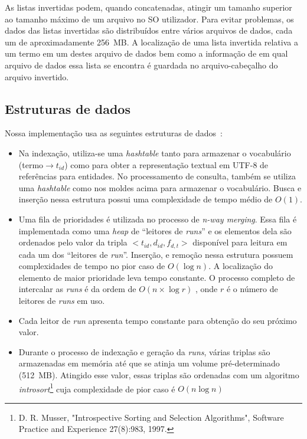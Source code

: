 \documentclass[10pt,twocolumn]{article}
\begin{document}
As listas invertidas podem, quando concatenadas, atingir um tamanho
superior ao tamanho máximo de um arquivo no SO utilizador. Para evitar
problemas, os dados das listas invertidas são distribuídos entre vários
arquivos de dados, cada um de aproximadamente 256~MB. A localização de
uma lista invertida relativa a um termo em um destes arquivo de dados
bem como a informação de em qual arquivo de dados essa lista se encontra
é guardada no arquivo-cabeçalho do arquivo invertido. 

\subsection{Estruturas de dados}\label{sec:datastructures}

Nossa implementação usa as seguintes estruturas de
dados~\cite{cormen-algorithms}:

\begin{itemize}

\item Na indexação, utiliza-se uma \emph{hashtable} tanto para armazenar
o vocabulário (termo\(\rightarrow t_{id}\)) como para obter a representação
textual em UTF-8 de referências para entidades. No processamento de
consulta, também se utiliza uma \emph{hashtable} como nos moldes acima
para armazenar o vocabulário.  Busca e inserção nessa estrutura possui
uma complexidade de tempo médio de \(O\left(1 \right)\).

\item Uma fila de prioridades é utilizada no processo de \emph{n-way
merging}. Essa fila é implementada como uma \emph{heap} de ``leitores de
\emph{runs}'' e os elementos dela são ordenados pelo valor da tripla
\(<t_{id}, d_{id}, f_{d,t}>\) disponível para leitura em cada um dos
``leitores de \emph{run}''.  Inserção, e remoção nessa estrutura possuem
complexidades de tempo no pior caso de \(O\left(\log n\right)\). A
localização do elemento de maior prioridade leva tempo constante.  O
processo completo de intercalar as \emph{runs} é da ordem de \(O\left(
n\times\log r\right)\) , onde \(r\) é o número de leitores de
\emph{runs} em uso.

\item Cada leitor de \emph{run} apresenta tempo constante para obtenção
do seu próximo valor.

\item Durante o processo de indexação e geração da \emph{runs}, várias
triplas são armazenadas em memória até que se atinja um volume
pré-determinado (512~MB). Atingido esse valor, essas triplas são
ordenadas com um algoritmo \emph{introsort}\footnote{ D. R. Musser,
"Introspective Sorting and Selection Algorithms", Software Practice and
Experience 27(8):983, 1997.  } cuja complexidade de pior caso é
\(O\left(n \log n\right)\)

\end{itemize}
\end{document}
